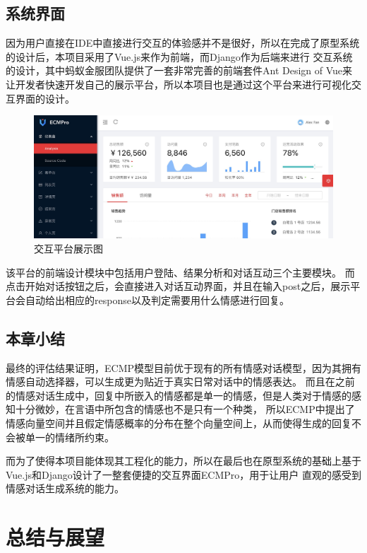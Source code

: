 \documentclass[supercite]{HustGraduPaper}
\theoremstyle{definition}
\begin{document}
\subsection{系统界面}
因为用户直接在IDE中直接进行交互的体验感并不是很好，所以在完成了原型系统的设计后，本项目采用了Vue.js来作为前端，而Django作为后端来进行
交互系统的设计，其中蚂蚁金服团队提供了一套非常完善的前端套件Ant Design of Vue来让开发者快速开发自己的展示平台，所以本项目也是通过这个平台来进行可视化交互界面的设计。
\begin{figure}[H] %
  \centering %
  \includegraphics[width=1\textwidth]{images/show.png} %
  \caption{交互平台展示图} %
  \label{Fig.show} %
\end{figure}
该平台的前端设计模块中包括用户登陆、结果分析和对话互动三个主要模块。
而点击开始对话按钮之后，会直接进入对话互动界面，并且在输入post之后，展示平台会自动给出相应的response以及判定需要用什么情感进行回复。

\subsection{本章小结}
最终的评估结果证明，ECMP模型目前优于现有的所有情感对话模型，因为其拥有情感自动选择器，可以生成更为贴近于真实日常对话中的情感表达。
而且在之前的情感对话生成中，回复中所嵌入的情感都是单一的情感，但是人类对于情感的感知十分微妙，在言语中所包含的情感也不是只有一个种类，
所以ECMP中提出了情感向量空间并且假定情感概率的分布在整个向量空间上，从而使得生成的回复不会被单一的情绪所约束。

而为了使得本项目能体现其工程化的能力，所以在最后也在原型系统的基础上基于Vue.js和Django设计了一整套便捷的交互界面ECMPro，用于让用户
直观的感受到情感对话生成系统的能力。


\section{总结与展望}
\end{document}
